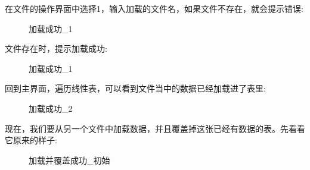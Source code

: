 \documentclass[supercite]{Experimental_Report}
\theoremstyle{definition}
\begin{document}
\noindent
在文件的操作界面中选择1，输入加载的文件名，如果文件不存在，就会提示错误:
\begin{figure}[htbp]
	\centering
	\centering
	\caption{加载成功\_1}
	\label{fig3-6}
\end{figure}

\clearpage
\noindent
文件存在时，提示加载成功:
\begin{figure}[htbp]
	\centering
	\centering
	\caption{加载成功\_1}
	\label{fig3-7}
\end{figure}

\noindent
回到主界面，遍历线性表，可以看到文件当中的数据已经加载进了表里:
\begin{figure}[htbp]
	\centering
	\centering
	\caption{加载成功\_2}
	\label{fig3-8}
\end{figure}

\noindent
现在，我们要从另一个文件中加载数据，并且覆盖掉这张已经有数据的表。先看看它原来的样子:
\begin{figure}[htbp]
	\centering
	\centering
	\caption{加载并覆盖成功\_初始}
	\label{fig3-9}
\end{figure}
\end{document}
